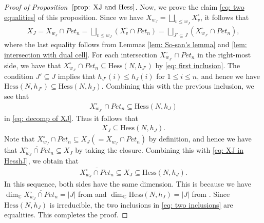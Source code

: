 \begin{proof}[Proof of Proposition~$\ref{prop: XJ and Hess}$]
Now, we prove the claim \eqref{eq: two equalities} of this proposition. Since we have $X_{w_J}=\bigsqcup_{v\le w_J}  X^{\circ}_{v}$, it follows that
\begin{align}\label{eq: decomp of XJ}
 X_{J}
 = X_{w_J}\cap Pet_{n}
 = \bigsqcup_{v\le w_J} ( X^{\circ}_{v}\cap Pet_{n} )
 = \bigsqcup_{J'\subseteq J} ( X^{\circ}_{w_{J'}}\cap Pet_{n} ), 
\end{align}
where the last equality follows from Lemmas \ref{lem: So-san's lemma} and \ref{lem: intersection with dual cell}. For each intersection $X^{\circ}_{w_{J'}}\cap Pet_{n}$ in the right-most side, we have that $X^{\circ}_{w_{J'}}\cap Pet_{n}\subseteq \text{Hess}(N,h_{J'})$ by \eqref{eq: first inclusion}. 
The condition $J'\subseteq J$ implies that $h_{J'}(i)\le h_J(i)$ for $1\le i\le n$, and hence we have $\text{Hess}(N,h_{J'})\subseteq \text{Hess}(N,h_{J})$. Combining this with the previous inclusion, we see that
\begin{align*}
 X^{\circ}_{w_{J'}}\cap Pet_{n}\subseteq \text{Hess}(N,h_J) 
\end{align*}
in \eqref{eq: decomp of XJ}. Thus it follows that
\begin{align}\label{eq: XJ in HesshJ}
 X_{J} \subseteq \text{Hess}(N,h_J).
\end{align}
Note that $X^{\circ}_{w_J}\cap Pet_{n} \subseteq X_{J}(=X_{w_J}\cap Pet_{n})$ by definition, and hence we have that $\overline{X^{\circ}_{w_J}\cap Pet_{n}} \subseteq X_{J}$ by taking the closure. Combining this with \eqref{eq: XJ in HesshJ}, we obtain that
\begin{align}\label{eq: two inclusions}
 \overline{X^{\circ}_{w_J}\cap Pet_{n}} \subseteq X_{J} \subseteq \text{Hess}(N,h_J).
\end{align}
In this sequence, both sides have the same dimension.  This is because we have $\dim_{{\mathbb C}} \overline{X^{\circ}_{w_J}\cap Pet_{n}} = |J|$ from \cite[Lemma~9]{Insko-Tymoczko} and $\dim_{{\mathbb C}} \text{Hess}(N,h_J)=|J|$ from \cite[Lemma~7.1]{an-ty}. Since $\text{Hess}(N,h_J)$ is irreducible, the two inclusions in \eqref{eq: two inclusions} are equalities. This completes the proof.
\end{proof}

